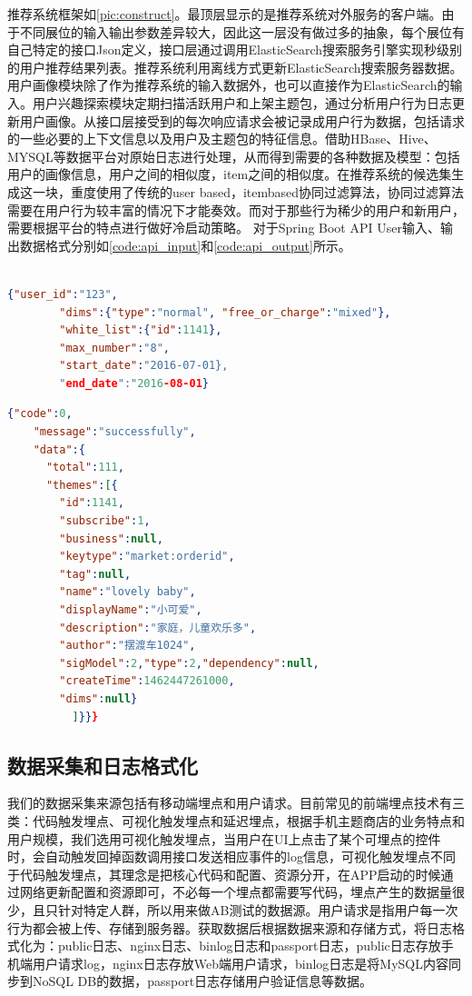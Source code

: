     推荐系统框架如\autoref{pic:construct}。最顶层显示的是推荐系统对外服务的客户端。由于不同展位的输入输出参数差异较大，因此这一层没有做过多的抽象，每个展位有自己特定的接口Json定义，接口层通过调用ElasticSearch搜索服务引擎实现秒级别的用户推荐结果列表。推荐系统利用离线方式更新ElasticSearch搜索服务器数据。用户画像模块除了作为推荐系统的输入数据外，也可以直接作为ElasticSearch的输入。用户兴趣探索模块定期扫描活跃用户和上架主题包，通过分析用户行为日志更新用户画像。从接口层接受到的每次响应请求会被记录成用户行为数据，包括请求的一些必要的上下文信息以及用户及主题包的特征信息。借助HBase、Hive、MYSQL等数据平台对原始日志进行处理，从而得到需要的各种数据及模型：包括用户的画像信息，用户之间的相似度，item之间的相似度。在推荐系统的候选集生成这一块，重度使用了传统的user based，itembased协同过滤算法，协同过滤算法需要在用户行为较丰富的情况下才能奏效。而对于那些行为稀少的用户和新用户，需要根据平台的特点进行做好冷启动策略。
    对于Spring Boot API User输入、输出数据格式分别如\autoref{code:api_input}和\autoref{code:api_output}所示。\\\\
    \begin{lstlisting}[language=json,firstnumber=1,label={code:api_input}]
      {"user_id":"123",
        "dims":{"type":"normal", "free_or_charge":"mixed"},
        "white_list":{"id":1141},
        "max_number":"8",
        "start_date":"2016-07-01},
        "end_date":"2016-08-01}
    \end{lstlisting}

    \begin{lstlisting}[language=json,firstnumber=1,label={code:api_output}]
    {"code":0,
    "message":"successfully",
    "data":{
      "total":111,
      "themes":[{
        "id":1141,
        "subscribe":1,
        "business":null,
        "keytype":"market:orderid",
        "tag":null,
        "name":"lovely baby",
        "displayName":"小可爱",
        "description":"家庭，儿童欢乐多",
        "author":"摆渡车1024",
        "sigModel":2,"type":2,"dependency":null,
        "createTime":1462447261000,
        "dims":null}
          ]}}}
    \end{lstlisting}

    \subsection{数据采集和日志格式化}
    我们的数据采集来源包括有移动端埋点和用户请求。目前常见的前端埋点技术有三类：代码触发埋点、可视化触发埋点和延迟埋点，根据手机主题商店的业务特点和用户规模，我们选用可视化触发埋点，当用户在UI上点击了某个可埋点的控件时，会自动触发回掉函数调用接口发送相应事件的log信息，可视化触发埋点不同于代码触发埋点，其理念是把核心代码和配置、资源分开，在APP启动的时候通过网络更新配置和资源即可，不必每一个埋点都需要写代码，埋点产生的数据量很少，且只针对特定人群，所以用来做AB测试的数据源。用户请求是指用户每一次行为都会被上传、存储到服务器。获取数据后根据数据来源和存储方式，将日志格式化为：public日志、nginx日志、binlog日志和passport日志，public日志存放手机端用户请求log，nginx日志存放Web端用户请求，binlog日志是将MySQL内容同步到NoSQL DB的数据，passport日志存储用户验证信息等数据。

